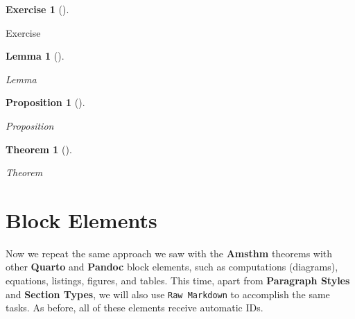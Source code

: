 \documentclass[
  12pt,
  a4paper,
  oneside,
  titlepage,
  toclink=all,
  toc=bibliography]{scrbook}
\theoremstyle{definition}
\theoremstyle{plain}
\theoremstyle{plain}
\theoremstyle{plain}
\newtheorem{theorem}{Theorem}[section]
\theoremstyle{plain}
\newtheorem{proposition}{Proposition}[section]
\theoremstyle{definition}
\newtheorem{exercise}{Exercise}[section]
\theoremstyle{definition}
\theoremstyle{plain}
\newtheorem{lemma}{Lemma}[section]
\theoremstyle{remark}
\begin{document}
\begin{exercise}[]\protect\hypertarget{exr-scriv9}{}\label{exr-scriv9}

Exercise

\end{exercise}

\begin{lemma}[]\protect\hypertarget{lem-scriv10}{}\label{lem-scriv10}

Lemma

\end{lemma}

\begin{proposition}[]\protect\hypertarget{prp-scriv11}{}\label{prp-scriv11}

Proposition

\end{proposition}

\begin{theorem}[]\protect\hypertarget{thm-scriv12}{}\label{thm-scriv12}

Theorem

\end{theorem}

\hypertarget{sec-scriv13}{%
\section{Block Elements}\label{sec-scriv13}}

\protect\hypertarget{scriv13}{}{}

Now we repeat the same approach we saw with the \textbf{Amsthm} theorems
with other \textbf{Quarto} and \textbf{Pandoc} block elements, such as
computations (diagrams), equations, listings, figures, and tables. This
time, apart from \textbf{Paragraph Styles} and \textbf{Section Types},
we will also use \texttt{Raw\ Markdown} to accomplish the same tasks. As
before, all of these elements receive automatic IDs.
\end{document}
